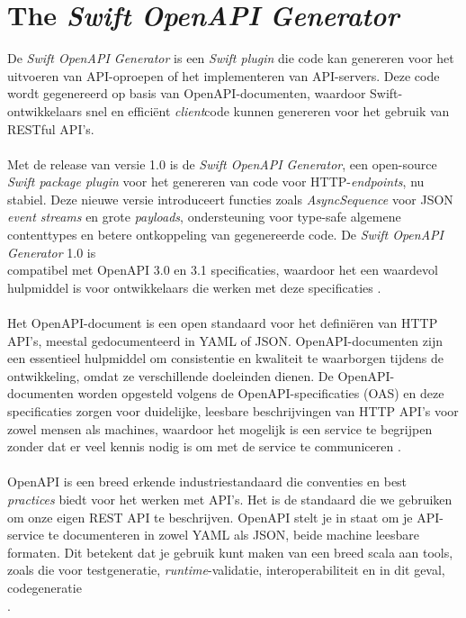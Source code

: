 \section{The \textit{Swift OpenAPI Generator}}
De \textit{Swift OpenAPI Generator} is een \textit{Swift plugin} die code kan genereren voor het \\uitvoeren van API-oproepen of het implementeren van API-servers. Deze code wordt gegenereerd op basis van OpenAPI-documenten, waardoor Swift-ontwikkelaars snel en efficiënt \textit{client}code kunnen genereren voor het gebruik van RESTful API's.
 \\  \\
Met de release van versie 1.0 is de \textit{Swift OpenAPI Generator}, een open-source \textit{Swift package plugin} voor het genereren van code voor HTTP-\textit{endpoints}, nu stabiel. Deze nieuwe versie introduceert functies zoals \textit{AsyncSequence} voor JSON \textit{event streams} en grote \textit{payloads}, ondersteuning voor type-safe algemene contenttypes en betere ontkoppeling van gegenereerde code. De \textit{Swift OpenAPI Generator} 1.0 is \\compatibel met OpenAPI 3.0 en 3.1 specificaties, waardoor het een waardevol hulpmiddel is voor ontwikkelaars die werken met deze specificaties \autocite{Simone2024}. 
 \\  \\
Het OpenAPI-document is een open standaard voor het definiëren van HTTP API's, meestal gedocumenteerd in YAML of JSON. OpenAPI-documenten zijn een essentieel hulpmiddel om consistentie en kwaliteit te waarborgen tijdens de ontwikkeling, omdat ze verschillende doeleinden dienen. De OpenAPI-documenten worden opgesteld volgens de OpenAPI-specificaties (OAS) en deze specificaties zorgen voor duidelijke, leesbare beschrijvingen van HTTP API's voor zowel mensen als machines, waardoor het mogelijk is een service te begrijpen zonder dat er veel kennis nodig is om met de service te communiceren \autocite{Miller2020}.
 \\  \\
OpenAPI is een breed erkende industriestandaard die conventies en best \\\textit{practices} biedt voor het werken met API's. Het is de standaard die we gebruiken om onze eigen REST API te beschrijven. OpenAPI stelt je in staat om je API-service te documenteren in zowel YAML als JSON, beide machine leesbare formaten. Dit betekent dat je gebruik kunt maken van een breed scala aan tools, zoals die voor testgeneratie, \textit{runtime}-validatie, interoperabiliteit en in dit geval, codegeneratie \\\autocite{Simone2024}. 

